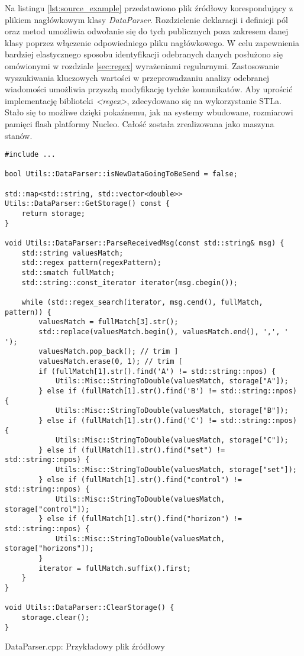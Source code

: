 Na listingu \ref{lst:source_example} przedstawiono plik źródłowy korespondujący z plikiem
nagłówkowym klasy \textit{DataParser}. Rozdzielenie deklaracji i definicji pól oraz metod umożliwia
odwołanie się do tych publicznych poza zakresem danej klasy poprzez włączenie odpowiedniego 
pliku nagłówkowego. W celu zapewnienia bardziej elastycznego sposobu identyfikacji odebranych
danych posłużono się omówionymi w rozdziale \ref{sec:regex} wyrażeniami regularnymi. Zastosowanie
wyszukiwania kluczowych wartości w przeprowadzaniu analizy odebranej wiadomości umożliwia
przyszłą modyfikację tychże komunikatów. Aby uprościć implementację biblioteki \textit{<regex>},
zdecydowano się na wykorzystanie STLa. Stało się to możliwe dzięki pokaźnemu, jak na systemy
wbudowane, rozmiarowi pamięci flash platformy Nucleo. Całość została zrealizowana jako maszyna stanów.

\begin{listing}[p]
\centering
\begin{verbatim}
#include ...

bool Utils::DataParser::isNewDataGoingToBeSend = false;

std::map<std::string, std::vector<double>> Utils::DataParser::GetStorage() const {
    return storage;
}

void Utils::DataParser::ParseReceivedMsg(const std::string& msg) {
    std::string valuesMatch;
    std::regex pattern(regexPattern);
    std::smatch fullMatch;
    std::string::const_iterator iterator(msg.cbegin());

    while (std::regex_search(iterator, msg.cend(), fullMatch, pattern)) {
        valuesMatch = fullMatch[3].str();
        std::replace(valuesMatch.begin(), valuesMatch.end(), ',', ' ');
        valuesMatch.pop_back(); // trim ]
        valuesMatch.erase(0, 1); // trim [
        if (fullMatch[1].str().find('A') != std::string::npos) {
            Utils::Misc::StringToDouble(valuesMatch, storage["A"]);
        } else if (fullMatch[1].str().find('B') != std::string::npos) {
            Utils::Misc::StringToDouble(valuesMatch, storage["B"]);
        } else if (fullMatch[1].str().find('C') != std::string::npos) {
            Utils::Misc::StringToDouble(valuesMatch, storage["C"]);
        } else if (fullMatch[1].str().find("set") != std::string::npos) {
            Utils::Misc::StringToDouble(valuesMatch, storage["set"]);
        } else if (fullMatch[1].str().find("control") != std::string::npos) {
            Utils::Misc::StringToDouble(valuesMatch, storage["control"]);
        } else if (fullMatch[1].str().find("horizon") != std::string::npos) {
            Utils::Misc::StringToDouble(valuesMatch, storage["horizons"]);
        }
        iterator = fullMatch.suffix().first;
    }
}

void Utils::DataParser::ClearStorage() {
    storage.clear();
}
\end{verbatim}
\caption{DataParser.cpp: Przykładowy plik źródłowy}
\label{lst:source_example}
\end{listing}

